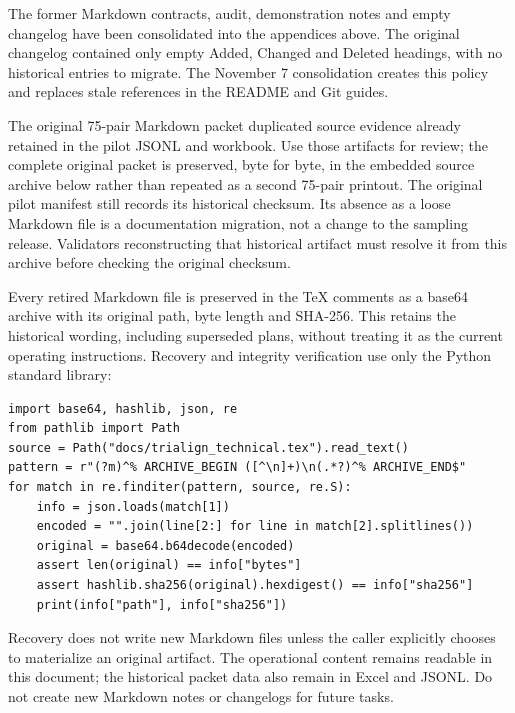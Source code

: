 \documentclass[10pt,letterpaper]{article}
\begin{document}
The former Markdown contracts, audit, demonstration notes and empty changelog
have been consolidated into the appendices above. The original changelog
contained only empty Added, Changed and Deleted headings, with no historical
entries to migrate. The November 7 consolidation creates this policy and
replaces stale references in the README and Git guides.

The original 75-pair Markdown packet duplicated source evidence already
retained in the pilot JSONL and workbook. Use those artifacts for review;
the complete original packet is preserved, byte for byte, in the embedded
source archive below rather than repeated as a second 75-pair printout.
The original pilot manifest still records its historical checksum. Its
absence as a loose Markdown file is a documentation migration, not a change
to the sampling release. Validators reconstructing that historical artifact
must resolve it from this archive before checking the original checksum.

Every retired Markdown file is preserved in the TeX comments as a base64
archive with its original path, byte length and SHA-256. This retains the
historical wording, including superseded plans, without treating it as the
current operating instructions. Recovery and integrity verification use only
the Python standard library:
\begin{Verbatim}[breaklines=true,fontsize=\small]
import base64, hashlib, json, re
from pathlib import Path
source = Path("docs/trialign_technical.tex").read_text()
pattern = r"(?m)^% ARCHIVE_BEGIN ([^\n]+)\n(.*?)^% ARCHIVE_END$"
for match in re.finditer(pattern, source, re.S):
    info = json.loads(match[1])
    encoded = "".join(line[2:] for line in match[2].splitlines())
    original = base64.b64decode(encoded)
    assert len(original) == info["bytes"]
    assert hashlib.sha256(original).hexdigest() == info["sha256"]
    print(info["path"], info["sha256"])
\end{Verbatim}
Recovery does not write new Markdown files unless the caller explicitly
chooses to materialize an original artifact. The operational content remains
readable in this document; the historical packet data also remain in Excel
and JSONL. Do not create new Markdown notes or changelogs for future tasks.
\end{document}

